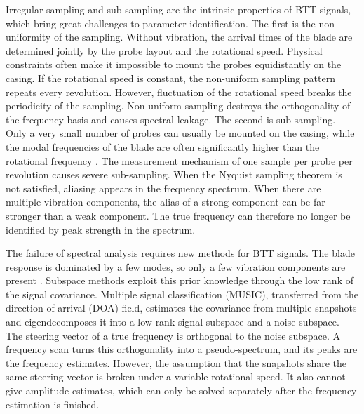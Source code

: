 \documentclass[journal,onecolumn]{IEEEtran}
\begin{document}
Irregular sampling and sub-sampling are the intrinsic properties of BTT signals, which bring great challenges to parameter identification\cite{wang_frequency_2025}. The first is the non-uniformity of the sampling. Without vibration, the arrival times of the blade are determined jointly by the probe layout and the rotational speed\cite{guida_modal_nodate}. Physical constraints often make it impossible to mount the probes equidistantly on the casing. If the rotational speed is constant, the non-uniform sampling pattern repeats every revolution\cite{bouchain_blade_2019}. However, fluctuation of the rotational speed breaks the periodicity of the sampling. Non-uniform sampling destroys the orthogonality of the frequency basis and causes spectral leakage\cite{elkhabbazi2026sliding}. The second is sub-sampling. Only a very small number of probes can usually be mounted on the casing, while the modal frequencies of the blade are often significantly higher than the rotational frequency \cite{wang_improved_2020}\cite{kharyton_advanced_2021}. The measurement mechanism of one sample per probe per revolution causes severe sub-sampling. When the Nyquist sampling theorem is not satisfied, aliasing appears in the frequency spectrum\cite{kharyton_discussion_2017}. When there are multiple vibration components, the alias of a strong component can be far stronger than a weak component. The true frequency can therefore no longer be identified by peak strength in the spectrum.

The failure of spectral analysis requires new methods for BTT signals. The blade response is dominated by a few modes, so only a few vibration components are present \cite{bouchain_blade_2019}. Subspace methods exploit this prior knowledge through the low rank of the signal covariance. Multiple signal classification (MUSIC), transferred from the direction-of-arrival (DOA) field, estimates the covariance from multiple snapshots and eigendecomposes it into a low-rank signal subspace and a noise subspace. The steering vector of a true frequency is orthogonal to the noise subspace. A frequency scan turns this orthogonality into a pseudo-spectrum, and its peaks are the frequency estimates\cite{schmidt_multiple_1986}. However, the assumption that the snapshots share the same steering vector is broken under a variable rotational speed. It also cannot give amplitude estimates, which can only be solved separately after the frequency estimation is finished\cite{wang_improved_2020}. 
\end{document}
